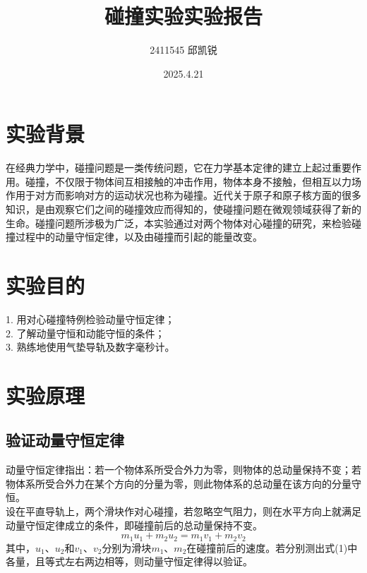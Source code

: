 \documentclass{article}
\title{碰撞实验实验报告}
\author{2411545 邱凯锐}
\date{2025.4.21}
\begin{document}
\maketitle
\section{实验背景}
\hspace*{2em}在经典力学中，碰撞问题是一类传统问题，它在力学基本定律的建立上起过重要作用。碰撞，不仅限于物体间互相接触的冲击作用，物体本身不接触，但相互以力场作用于对方而影响对方的运动状况也称为碰撞。近代关于原子和原子核方面的很多知识，是由观察它们之间的碰撞效应而得知的，使碰撞问题在微观领域获得了新的生命。碰撞问题所涉极为广泛，本实验通过对两个物体对心碰撞的研究，来检验碰撞过程中的动量守恒定律，以及由碰撞而引起的能量改变。 
\section{实验目的}
1. 用对心碰撞特例检验动量守恒定律；\\
2. 了解动量守恒和动能守恒的条件；\\
3. 熟练地使用气垫导轨及数字毫秒计。 
\section{实验原理}
\subsection{验证动量守恒定律}
\hspace*{2em}动量守恒定律指出：若一个物体系所受合外力为零，则物体的总动量保持不变；若物体系所受合外力在某个方向的分量为零，则此物体系的总动量在该方向的分量守恒。\\
\hspace*{2em}设在平直导轨上，两个滑块作对心碰撞，若忽略空气阻力，则在水平方向上就满足动量守恒定律成立的条件，即碰撞前后的总动量保持不变。
\begin{equation}
    m_1u_1+m_2u_2=m_1v_1+m_2v_2
\end{equation}
\hspace*{2em}其中，\(u_1\)、\(u_2\)和\(v_1\)、\(v_2\)分别为滑块\(m_1\)、\(m_2\)在碰撞前后的速度。若分别测出式(1)中各量，且等式左右两边相等，则动量守恒定律得以验证。
\end{document}

